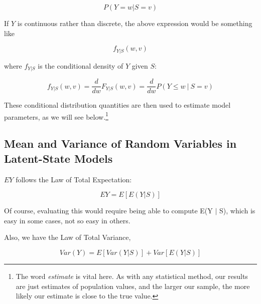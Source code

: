 \documentclass[11pt]{article}
\begin{document}
\begin{equation}
P(Y = w | S  = v)
\end{equation}

If $Y$ is continuous rather than discrete, the above expression would be
something like

\begin{equation}
f_{Y|S} (w,v) 
\end{equation}

where $f_{Y|S}$ is the conditional density of $Y$ given $S$:

\begin{equation}
f_{Y|S}(w,v) 
= \frac{d}{dw} F_{Y|S}(w,v) 
= \frac{d}{dw} P(Y \leq w ~|~ S = v)
\end{equation}

These conditional distribution quantities are then used to estimate
model parameters, as we will see below.\footnote{The word
\textit{estimate} is vital here.  As with any statistical method, our
results are just estimates of population values, and the larger our
sample, the more likely our estimate is close to the true value.}

\subsection{Mean and Variance of Random Variables in Latent-State Models}
\label{mixmeanvar}

$EY$ follows the Law of Total Expectation:

\begin{equation}
\label{mixmean}
EY = E[E(Y | S)]
\end{equation}

Of course, evaluating this would require being able to compute E(Y $|$
S), which is easy in some cases, not so easy in others.

Also, we have the Law of Total Variance, 

\begin{equation}
\label{mixvar}
Var(Y) = E[Var(Y|S)] + Var[E(Y|S)]
\end{equation}

% 
% 
% 
\end{document}
